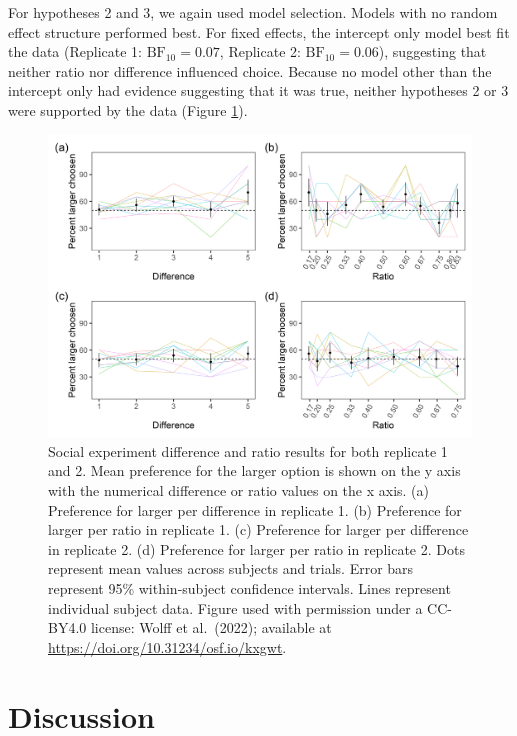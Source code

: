 \documentclass[
  ,doc,floatsintext]{apa6}
\begin{document}
For hypotheses 2 and 3, we again used model selection. Models with no random effect structure performed best. For fixed effects, the intercept only model best fit the data (Replicate 1: \(\mathrm{BF}_{\textrm{10}} = 0.07\), Replicate 2: \(\mathrm{BF}_{\textrm{10}} = 0.06\)), suggesting that neither ratio nor difference influenced choice. Because no model other than the intercept only had evidence suggesting that it was true, neither hypotheses 2 or 3 were supported by the data (Figure \ref{fig:socialgraphs}).



\begin{figure}

{\centering \includegraphics[width=1\linewidth]{../figures/social_figure} 

}

\caption{Social experiment difference and ratio results for both replicate 1 and 2. Mean preference for the larger option is shown on the y axis with the numerical difference or ratio values on the x axis. (a) Preference for larger per difference in replicate 1. (b) Preference for larger per ratio in replicate 1. (c) Preference for larger per difference in replicate 2. (d) Preference for larger per ratio in replicate 2. Dots represent mean values across subjects and trials. Error bars represent 95\% within-subject confidence intervals. Lines represent individual subject data. Figure used with permission under a CC-BY4.0 license: Wolff et al.~(2022); available at \url{https://doi.org/10.31234/osf.io/kxgwt}.}\label{fig:socialgraphs}
\end{figure}

\hypertarget{discussion}{%
\section{Discussion}\label{discussion}}
\end{document}
